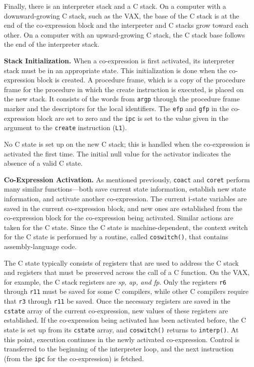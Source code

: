 Finally, there is an interpreter stack and a C stack. On a computer
with a downward-growing C stack, such as the VAX, the base of the C
stack is at the end of the co-expression block and the interpreter and
C stacks grow toward each other. On a computer with an upward-growing
C stack, the C stack base follows the end of the interpreter stack.

\textbf{Stack Initialization.} When a co-expression is first
activated, its interpreter stack must be in an appropriate state. This
initialization is done when the co-expression block is created. A
procedure frame, which is a copy of the procedure frame for the
procedure in which the create instruction is executed, is placed on
the new stack. It consists of the words from \texttt{argp} through the
procedure frame marker and the descriptors for the local
identifiers. The \texttt{efp} and \texttt{gfp} in the co-expression
block are set to zero and the \texttt{ipc} is set to the value given
in the argument to the \texttt{create} instruction (\texttt{L1}).

No C state is set up on the new C stack; this is handled when the
co-expression is activated the first time. The initial null value for
the activator indicates the absence of a valid C state.


\textbf{Co-Expression Activation.} As mentioned previously,
\texttt{coact} and \texttt{coret} perform many similar functions{---}both
save current state information, establish new state information, and
activate another co-expression.  The current i-state variables are
saved in the current co-expression block, and new ones are established
from the co-expression block for the co-expression being
activated. Similar actions are taken for the C state. Since the C
state is machine-dependent, the {\textquotedbl}context
switch{\textquotedbl} for the C state is performed by a routine,
called \texttt{coswitch()}, that contains assembly-language code.

The C state typically consists of registers that are used to address
the C stack and registers that must be preserved across the call of a
C function. On the VAX, for example, the C stack registers are
\textit{sp, ap, and fp}. Only the registers \texttt{r6} through
\texttt{r11} must be saved for some C compilers, while other C
compilers require that \texttt{r3} through \texttt{r11} be saved. Once
the necessary registers are saved in the \texttt{cstate} array of the
current co-expression, new values of these registers are
established. If the co-expression being activated has been activated
before, the C state is set up from its \texttt{cstate} array, and
\texttt{coswitch()} returns to \texttt{interp()}. At this point,
execution continues in the newly activated co-expression. Control is
transferred to the beginning of the interpreter loop, and the next
instruction (from the \texttt{ipc} for the co-expression) is fetched.

